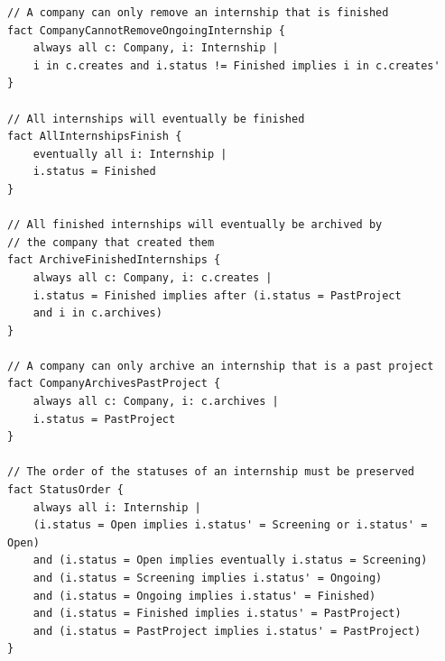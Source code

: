 \documentclass[11pt,twoside]{article}
\begin{document}
{\begin{verbatim}
// A company can only remove an internship that is finished
fact CompanyCannotRemoveOngoingInternship {
    always all c: Company, i: Internship |
    i in c.creates and i.status != Finished implies i in c.creates'
}

// All internships will eventually be finished
fact AllInternshipsFinish {
    eventually all i: Internship |
    i.status = Finished
}

// All finished internships will eventually be archived by
// the company that created them
fact ArchiveFinishedInternships {
    always all c: Company, i: c.creates |
    i.status = Finished implies after (i.status = PastProject 
    and i in c.archives)
}

// A company can only archive an internship that is a past project
fact CompanyArchivesPastProject {
    always all c: Company, i: c.archives |
    i.status = PastProject
}

// The order of the statuses of an internship must be preserved
fact StatusOrder {
    always all i: Internship |
    (i.status = Open implies i.status' = Screening or i.status' = Open)
    and (i.status = Open implies eventually i.status = Screening)
    and (i.status = Screening implies i.status' = Ongoing)
    and (i.status = Ongoing implies i.status' = Finished)
    and (i.status = Finished implies i.status' = PastProject)
    and (i.status = PastProject implies i.status' = PastProject)
}
\end{verbatim}
}
\end{document}
